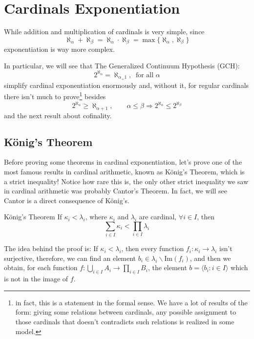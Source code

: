 \chapter{Cardinals Exponentiation}

While addition and multiplication of cardinals is very simple, since
$$\aleph_\alpha+\aleph_\beta=\aleph_\alpha\cdot\aleph_\beta=\max\{\aleph_\alpha,\aleph_\beta\}$$
exponentiation is way more complex.

In particular, we will see that The Generalized Continuum Hypothesis (GCH):
$$2^{\aleph_\alpha}=\aleph_{\alpha_+1},~\text{ for all }\alpha$$
simplify cardinal exponentiation enormously and, without it, for regular cardinals there isn't much to prove\footnote{in fact, this is a statement in the formal sense. We have a lot of results of the form: giving some relations between cardinals, any possible assignment to those cardinals that doesn't contradicts such relations is realized in some model.} besides
\begin{equation}\label{2_exp_prop}
    2^{\aleph_\alpha}\geq\aleph_{\alpha+1},\qquad\alpha\leq\beta\Rightarrow 2^{\aleph_\alpha}\leq2^{\aleph_\beta}
\end{equation}
and the next result about cofinality.

\section{König's Theorem}

Before proving some theorems in cardinal exponentiation, let's prove one of the most famous results in cardinal arithmetic, known as König's Theorem, which is a strict inequality! Notice how rare this is, the only other strict inequality we saw in cardinal arithmetic was probably Cantor's Theorem. In fact, we will see Cantor is a direct consequence of König's.

\begin{theorem}{König's Theorem}{}
    If $\kappa_i<\lambda_i$, where $\kappa_i$ and $\lambda_i$ are cardinal, $\forall i\in I$, then
    $$\sum_{i \in I}\kappa_i<\prod_{i\in I}\lambda_i$$
\end{theorem}

The idea behind the proof is: If $\kappa_i<\lambda_i$, then every function $f_i:\kappa_i\to\lambda_i$ isn't surjective, therefore, we can find an element $b_i\in\lambda_i\backslash\text{Im}(f_i)$, and then we obtain, for each function $f:\bigcup_{i\in I}A_i\to\prod_{i\in I}B_i$, the element $b=\langle b_i:i\in I\rangle$ which is not in the image of $f$.

